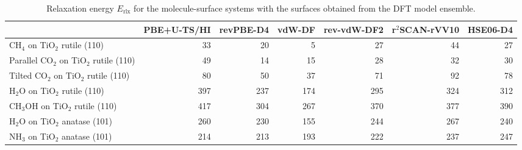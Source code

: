 \begin{table}
\caption{\label{tab:lattice_parameters_tio2}Relaxation energy $E_\textrm{rlx}$ for the molecule-surface systems with the  surfaces obtained from the DFT model ensemble.}
\begin{tabular}{lrrrrrr}
\toprule
 & PBE+U-TS/HI & revPBE-D4 & vdW-DF & rev-vdW-DF2 & r$^2$SCAN-rVV10 & HSE06-D4 \\ 
\midrule
CH$_4$ on TiO$_2$ rutile (110) & 33 & 20 & 5 & 27 & 44 & 27 \\
Parallel CO$_2$ on TiO$_2$ rutile (110) & 49 & 14 & 15 & 28 & 32 & 30 \\
Tilted CO$_2$ on TiO$_2$ rutile (110) & 80 & 50 & 37 & 71 & 92 & 78 \\
H$_2$O on TiO$_2$ rutile (110) & 397 & 237 & 174 & 295 & 324 & 312 \\
CH$_3$OH on TiO$_2$ rutile (110) & 417 & 304 & 267 & 370 & 377 & 390 \\
H$_2$O on TiO$_2$ anatase (101) & 260 & 230 & 155 & 244 & 267 & 240 \\
NH$_3$ on TiO$_2$ anatase (101) & 214 & 213 & 193 & 222 & 237 & 247 \\
\bottomrule
\end{tabular}
\end{table}